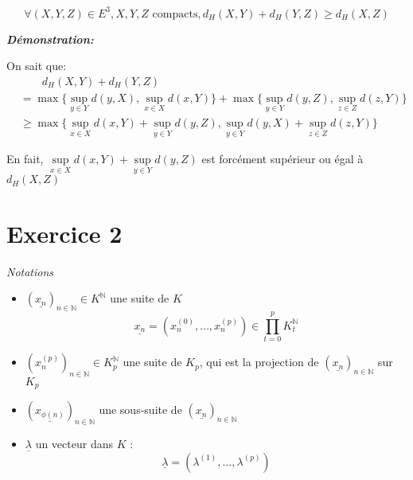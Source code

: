 \documentclass{article}
\begin{document}
\begin{enumerate}
\begin{tcolorbox}
$$\forall (X,Y,Z) \in E^{3}, X,Y,Z \text{ compacts}, d_{H}(X,Y)+d_{H}(Y,Z) \geq d_{H}(X,Z)
$$
\end{tcolorbox}
\textit{\textbf{Démonstration:}}
\par
On sait que:
\begin{align*}
 &\quad\quad d_{H}(X,Y)+d_{H}(Y,Z) \\
 &= \max\{\mathop{sup}\limits_{y\in Y} d(y,X), \mathop{sup}\limits_{x\in X} d(x,Y)\} 
+ \max\{\mathop{sup}\limits_{y\in Y} d(y,Z), \mathop{sup}\limits_{z\in Z} d(z,Y)\} \\
 &\geq \max \{ \mathop{sup}\limits_{x\in X} d(x,Y) + \mathop{sup}\limits_{y\in Y} d(y,Z), \mathop{sup}\limits_{y\in Y} d(y,X) + \mathop{sup}\limits_{z\in Z} d(z,Y)\}
\end{align*}


\vspace{1em}
\vspace{1em}
En fait, $\mathop{sup}\limits_{x\in X} d(x,Y) + \mathop{sup}\limits_{y\in Y} d(y,Z)$ est forcément supérieur ou égal à $d_{H}(X,Z)$
\end{enumerate}












\newpage

\section{Exercice 2}

\textit{Notations}

\begin{itemize}
    

    \item $(\underline{x_n})_{n \in \mathbb{N} } \in K^\mathbb{N}$ une suite de $K$
        \[
            \underline{x_n} = \left( x_n^{(0)} , \ldots, x_n^{(p)}\right) \in \prod_{t=0}^p K_t^\mathbb{N} 
        \]


    \item $(x_n^{(p)})_{n \in \mathbb{N} } \in K_p^{\mathbb{N} }$ une suite de $K_p$, qui est la projection de $\left( \underline{x_n} \right) _{n \in \mathbb{ N}}$ sur $K_p$
    \item $(\underline{x_{\phi(n)}})_{n \in \mathbb{N} }$ une sous-suite de $(\underline{x_n})_{n \in \mathbb{N} }$
    \item $\underline{\lambda}$ un vecteur dans  $K$ :
        \[
            \underline{\lambda} = \left( \lambda^{(1)}, \ldots, \lambda^{(p)} \right) 
        \]
        
        

\end{itemize}
\end{document}
